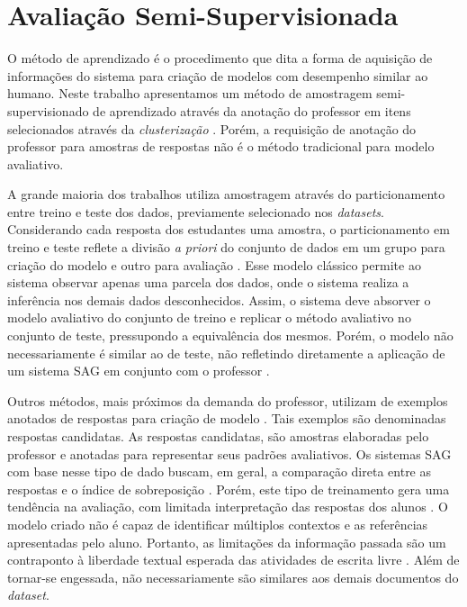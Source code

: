 \section{Avaliação Semi-Supervisionada}

O método de aprendizado é o procedimento que dita a forma de aquisição de informações do sistema para criação de modelos com desempenho similar ao humano. Neste trabalho apresentamos um método de amostragem semi-supervisionado de aprendizado através da anotação do professor em itens selecionados através da \textit{clusterização} \cite{horbach2018}. Porém, a requisição de anotação do professor para amostras de respostas não é o método tradicional para modelo avaliativo.

A grande maioria dos trabalhos utiliza amostragem através do particionamento entre treino e teste dos dados, previamente selecionado nos \textit{datasets}. Considerando cada resposta dos estudantes uma amostra, o particionamento em treino e teste reflete a divisão \textit{a priori} do conjunto de dados em um grupo para criação do modelo e outro para avaliação \cite{heilman2015}. Esse modelo clássico permite ao sistema observar apenas uma parcela dos dados, onde o sistema realiza a inferência nos demais dados desconhecidos. Assim, o sistema deve absorver o modelo avaliativo do conjunto de treino e replicar o método avaliativo no conjunto de teste, pressupondo a equivalência dos mesmos. Porém, o modelo não necessariamente é similar ao de teste, não refletindo diretamente a aplicação de um sistema SAG em conjunto com o professor \cite{sung2019a}.

Outros métodos, mais próximos da demanda do professor, utilizam de exemplos anotados de respostas para criação de modelo \cite{banjade2015, roy2016}. Tais exemplos são denominadas respostas candidatas. As respostas candidatas, são amostras elaboradas pelo professor e anotadas para representar seus padrões avaliativos. Os sistemas SAG com base nesse tipo de dado buscam, em geral, a comparação direta entre as respostas e o índice de sobreposição \cite{kar2017, jimenez2013}. Porém, este tipo de treinamento gera uma tendência na avaliação, com limitada interpretação das respostas dos alunos \cite{ramachandran2015a}. O modelo criado não é capaz de identificar múltiplos contextos e as referências apresentadas pelo aluno. Portanto, as limitações da informação passada são um contraponto à liberdade textual esperada das atividades de escrita livre \cite{burrows2015}. Além de tornar-se engessada, não necessariamente são similares aos demais documentos do \textit{dataset}.

